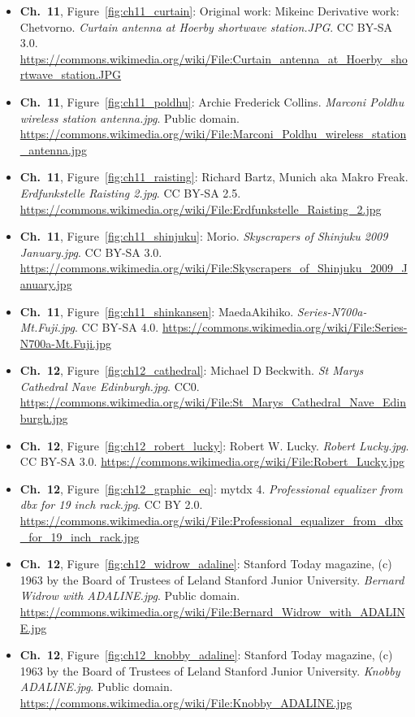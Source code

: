 \begin{small}
\begin{itemize}[leftmargin=0pt,itemsep=2pt,label={}]
\item \textbf{Ch.~11}, Figure~\ref{fig:ch11_curtain}: Original work: Mikeinc Derivative work: Chetvorno. \emph{Curtain antenna at Hoerby shortwave station.\allowbreak{}JPG}. CC BY-SA 3.0. \url{https://commons.wikimedia.org/wiki/File:Curtain_antenna_at_Hoerby_shortwave_station.JPG}
\item \textbf{Ch.~11}, Figure~\ref{fig:ch11_poldhu}: Archie Frederick Collins. \emph{Marconi Poldhu wireless station antenna.\allowbreak{}jpg}. Public domain. \url{https://commons.wikimedia.org/wiki/File:Marconi_Poldhu_wireless_station_antenna.jpg}
\item \textbf{Ch.~11}, Figure~\ref{fig:ch11_raisting}: Richard Bartz, Munich aka Makro Freak. \emph{Erdfunkstelle Raisting 2.\allowbreak{}jpg}. CC BY-SA 2.5. \url{https://commons.wikimedia.org/wiki/File:Erdfunkstelle_Raisting_2.jpg}
\item \textbf{Ch.~11}, Figure~\ref{fig:ch11_shinjuku}: Morio. \emph{Skyscrapers of Shinjuku 2009 January.\allowbreak{}jpg}. CC BY-SA 3.0. \url{https://commons.wikimedia.org/wiki/File:Skyscrapers_of_Shinjuku_2009_January.jpg}
\item \textbf{Ch.~11}, Figure~\ref{fig:ch11_shinkansen}: MaedaAkihiko. \emph{Series-\allowbreak{}N700a-\allowbreak{}Mt.\allowbreak{}Fuji.\allowbreak{}jpg}. CC BY-SA 4.0. \url{https://commons.wikimedia.org/wiki/File:Series-N700a-Mt.Fuji.jpg}
\item \textbf{Ch.~12}, Figure~\ref{fig:ch12_cathedral}: Michael D Beckwith. \emph{St Marys Cathedral Nave Edinburgh.\allowbreak{}jpg}. CC0. \url{https://commons.wikimedia.org/wiki/File:St_Marys_Cathedral_Nave_Edinburgh.jpg}
\item \textbf{Ch.~12}, Figure~\ref{fig:ch12_robert_lucky}: Robert W. Lucky. \emph{Robert Lucky.\allowbreak{}jpg}. CC BY-SA 3.0. \url{https://commons.wikimedia.org/wiki/File:Robert_Lucky.jpg}
\item \textbf{Ch.~12}, Figure~\ref{fig:ch12_graphic_eq}: mytdx 4. \emph{Professional equalizer from dbx for 19 inch rack.\allowbreak{}jpg}. CC BY 2.0. \url{https://commons.wikimedia.org/wiki/File:Professional_equalizer_from_dbx_for_19_inch_rack.jpg}
\item \textbf{Ch.~12}, Figure~\ref{fig:ch12_widrow_adaline}: Stanford Today magazine, (c) 1963 by the Board of Trustees of Leland Stanford Junior University. \emph{Bernard Widrow with ADALINE.\allowbreak{}jpg}. Public domain. \url{https://commons.wikimedia.org/wiki/File:Bernard_Widrow_with_ADALINE.jpg}
\item \textbf{Ch.~12}, Figure~\ref{fig:ch12_knobby_adaline}: Stanford Today magazine, (c) 1963 by the Board of Trustees of Leland Stanford Junior University. \emph{Knobby ADALINE.\allowbreak{}jpg}. Public domain. \url{https://commons.wikimedia.org/wiki/File:Knobby_ADALINE.jpg}

\end{itemize}
\end{small}
